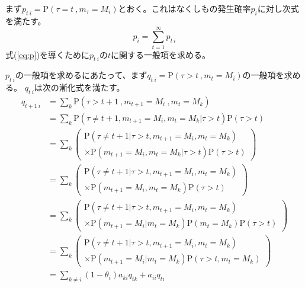\documentclass{jarticle}
\numberwithin{equation}{section}
\numberwithin{table}{section}
\theoremstyle{plain}
\begin{document}
まず$ p_{t\ i} = \mathrm{P}(\tau = t\ , m_\tau = M_i) $とおく。これはなくしもの発生確率$p_i$に対し次式を満たす。
\begin{equation} \label{eq:pi=sum_pti}
    p_i = \sum_{t=1}^{\infty}p_{t\ i}
\end{equation}
式(\ref{eq:p})を導くために$ p_{t\ i} $の$t$に関する一般項を求める。

$ p_{t\ i} $の一般項を求めるにあたって、まず$ q_{t\ i} = \mathrm{P}(\tau > t\ , m_t=M_i) $の一般項を求める。
$ q_{t\ i} $は次の漸化式を満たす。
\begin{align}
    q_{t+1\ i} & = \! \sum_{k} \mathrm{P}(\tau \! > \! t + 1\ , m_{t+1} \! = \! M_i\ , m_t \! = \! M_k) \nonumber\\
    & = \! \sum_{k} \mathrm{P}(\tau \! \ne \! t + 1 , m_{t+1} \! = \! M_i , m_t \! = \! M_k | \tau \! > \! t) \mathrm{P}(\tau \! > \! t) \nonumber\\
    & = \! \sum_{k} \left(
        \begin{array}{l}
            \mathrm{P}(\tau \! \ne \! t + 1 | \tau \! > \! t , m_{t+1} \! = \! M_i , m_t \! = \! M_k) \\
            \times \mathrm{P}(m_{t+1} \! = \! M_i , m_t \! = \! M_k | \tau \! > \! t) \mathrm{P}(\tau \! > \! t)
        \end{array}
     \right) \nonumber\\
    & = \! \sum_{k} \left(
        \begin{array}{l}
            \mathrm{P}(\tau \! \ne \! t + 1 | \tau \! > \! t , m_{t+1} \! = \! M_i , m_t \! = \! M_k) \\
            \times \mathrm{P}(m_{t+1} \! = \! M_i , m_t \! = \! M_k) \mathrm{P}(\tau \! > \! t)
        \end{array}
    \right) \nonumber\\
    & = \! \sum_{k} \left(
        \begin{array}{l}
            \mathrm{P}(\tau \! \ne \! t + 1 | \tau \! > \! t , m_{t+1} \! = \! M_i , m_t \! = \! M_k) \\
            \times \mathrm{P}(m_{t+1} \! = \! M_i | m_t \! = \! M_k) \mathrm{P}(m_t \! = \! M_k) \mathrm{P}(\tau \! > \! t)
        \end{array}
    \right) \nonumber\\
    & = \! \sum_{k} \left(
        \begin{array}{l}
            \mathrm{P}(\tau \! \ne \! t + 1 | \tau \! > \! t , m_{t+1} \! = \! M_i , m_t \! = \! M_k) \\
            \times \mathrm{P}(m_{t+1} \! = \! M_i | m_t \! = \! M_k) \mathrm{P}(\tau \! > \! t , m_t \! = \! M_k)
        \end{array}
    \right) \nonumber\\
    & = \! \sum_{k \ne i} (1 - \theta_i) a_{k i} q_{t k} + a_{i i} q_{t i} \label{eq:qti_rec}
\end{align}
\end{document}
